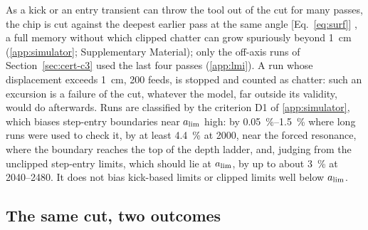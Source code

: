 As a kick or an entry transient can throw the tool out of the cut for many passes, the chip is cut against the deepest earlier pass at the same angle [Eq.~\eqref{eq:surf}] \citep{tlusty1981basic}, a full memory without which clipped chatter can grow spuriously beyond \SI{1}{\centi\metre} (\ref{app:simulator}; Supplementary Material); only the off-axis runs of Section~\ref{sec:cert-c3} used the last four passes (\ref{app:lmi}). A run whose displacement exceeds \SI{1}{\centi\metre}, 200 feeds, is stopped and counted as chatter: such an excursion is a failure of the cut, whatever the model, far outside its validity, would do afterwards. Runs are classified by the criterion D1 of \ref{app:simulator}, which biases step-entry boundaries near $a_{\lim}$ high: by \SIrange{0.05}{1.5}{\percent} where long runs were used to check it, by at least \SI{4.4}{\percent} at \SI{2000}{\rpm}, near the forced resonance, where the boundary reaches the top of the depth ladder, and, judging from the unclipped step-entry limits, which should lie at $a_{\lim}$, by up to about \SI{3}{\percent} at 2040--\SI{2480}{\rpm}. It does not bias kick-based limits or clipped limits well below $a_{\lim}$.

\subsection{The same cut, two outcomes}\label{sec:bistab-two}

